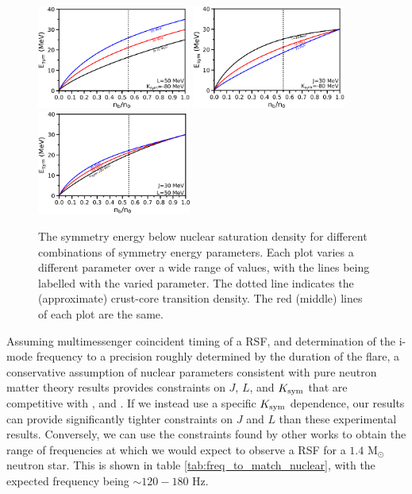 \documentclass[fleqn,usenatbib]{mnras}
\begin{document}
\begin{figure}
\centering
\includegraphics[width=0.45\textwidth,angle=0]{Esym_nb_J.png}
\includegraphics[width=0.45\textwidth,angle=0]{Esym_nb_L.png}
\includegraphics[width=0.45\textwidth,angle=0]{Esym_nb_K.png}
\caption{The symmetry energy below nuclear saturation density for different combinations of symmetry energy parameters. Each plot varies a different parameter over a wide range of values, with the lines being labelled with the varied parameter. The dotted line indicates the (approximate) crust-core transition density. The red (middle) lines of each plot are the same.}
\label{fig:Esym_JLK}
\end{figure}







Assuming multimessenger coincident timing of a RSF, and determination of the i-mode frequency to a precision roughly determined by the duration of the flare, a conservative assumption of nuclear parameters consistent with pure neutron matter theory results provides constraints on $J$, $L$, and $K_{\rm sym}$ that are competitive with \citet{kortelainen2010nuclear}, \citet{chen2010density} and \citet{tsang2009constraints}. If we instead use a specific $K_{\rm sym}$ dependence, our results can provide significantly tighter constraints on $J$ and $L$ than these experimental results. Conversely, we can use the constraints found by other works to obtain the range of frequencies at which we would expect to observe a RSF for a $1.4$ M$_{\odot}$ neutron star. This is shown in table \ref{tab:freq_to_match_nuclear}, with the expected frequency being $\sim 120-180$ Hz.
\end{document}
